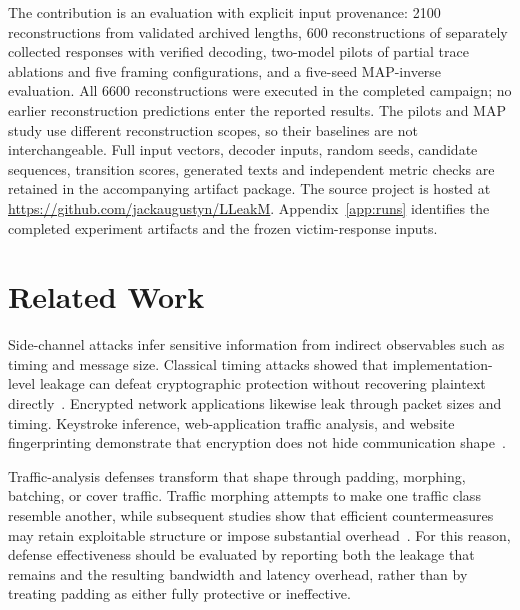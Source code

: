 \documentclass[electronics,article,submit,pdftex,moreauthors]{Definitions/mdpi}
\begin{document}
The contribution is an evaluation with explicit input provenance: 2100 reconstructions from validated archived lengths, 600 reconstructions of separately collected responses with verified decoding, two-model pilots of partial trace ablations and five framing configurations, and a five-seed MAP-inverse evaluation. All 6600 reconstructions were executed in the completed campaign; no earlier reconstruction predictions enter the reported results. The pilots and MAP study use different reconstruction scopes, so their baselines are not interchangeable. Full input vectors, decoder inputs, random seeds, candidate sequences, transition scores, generated texts and independent metric checks are retained in the accompanying artifact package. The source project is hosted at \url{https://github.com/jackaugustyn/LLeakM}. Appendix~\ref{app:runs} identifies the completed experiment artifacts and the frozen victim-response inputs.

\section{Related Work}
Side-channel attacks infer sensitive information from indirect observables such as timing and message size. Classical timing attacks showed that implementation-level leakage can defeat cryptographic protection without recovering plaintext directly~\cite{kocher1996timing}. Encrypted network applications likewise leak through packet sizes and timing. Keystroke inference, web-application traffic analysis, and website fingerprinting demonstrate that encryption does not hide communication shape~\cite{song2001timing,chen2010sidechannel,cai2012touching,sirinam2018deep}.

Traffic-analysis defenses transform that shape through padding, morphing, batching, or cover traffic. Traffic morphing attempts to make one traffic class resemble another, while subsequent studies show that efficient countermeasures may retain exploitable structure or impose substantial overhead~\cite{wright2009morphing,dyer2012peekaboo}. For this reason, defense effectiveness should be evaluated by reporting both the leakage that remains and the resulting bandwidth and latency overhead, rather than by treating padding as either fully protective or ineffective.
\end{document}
